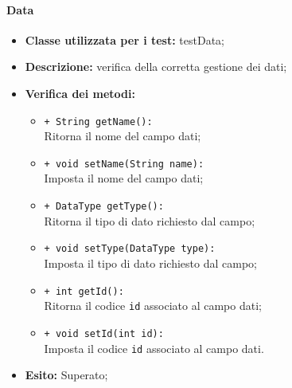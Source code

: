\paragraph{Data}
\begin{flushleft}
\begin{itemize}
\item \textbf{Classe utilizzata per i test:} testData;
\item \textbf{Descrizione:} verifica della corretta gestione dei dati;
\item \textbf{Verifica dei metodi:}
\begin{sloppypar}
\begin{itemize}
\item \texttt{+ String getName():}\\ Ritorna il nome del campo dati;
\item \texttt{+ void setName(String name):}\\ Imposta il nome del campo dati;
\item \texttt{+ DataType getType():}\\ Ritorna il tipo di dato richiesto dal campo;
\item \texttt{+ void setType(DataType type):}\\ Imposta il tipo di dato richiesto dal campo;
\item \texttt{+ int getId():}\\ Ritorna il codice \texttt{id} associato al campo dati;
\item \texttt{+ void setId(int id):}\\ Imposta il codice \texttt{id} associato al campo dati.
\end{itemize}
\end{sloppypar}
\item \textbf{Esito:} Superato;
\end{itemize}
\end{flushleft}

